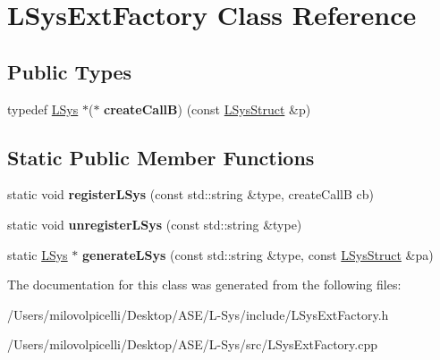 \hypertarget{class_l_sys_ext_factory}{}\section{L\+Sys\+Ext\+Factory Class Reference}
\label{class_l_sys_ext_factory}
\subsection*{Public Types}
\begin{DoxyCompactItemize}
\item 
\mbox{\label{class_l_sys_ext_factory_aea07e09c73a0012c0253ed86ade05183}} 
typedef \hyperlink{class_l_sys}{L\+Sys} $\ast$($\ast$ {\bfseries create\+CallB}) (const \hyperlink{struct_l_sys_struct}{L\+Sys\+Struct} \&p)
\end{DoxyCompactItemize}
\subsection*{Static Public Member Functions}
\begin{DoxyCompactItemize}
\item 
\mbox{\label{class_l_sys_ext_factory_a524bfed8598c8ffdaca2faf2157495f2}} 
static void {\bfseries register\+L\+Sys} (const std\+::string \&type, create\+CallB cb)
\item 
\mbox{\label{class_l_sys_ext_factory_ad35f53d013ae6d1103a27bd4f1e6d920}} 
static void {\bfseries unregister\+L\+Sys} (const std\+::string \&type)
\item 
\mbox{\label{class_l_sys_ext_factory_a6fff1491369857a2b5ba9ba0699a3d5c}} 
static \hyperlink{class_l_sys}{L\+Sys} $\ast$ {\bfseries generate\+L\+Sys} (const std\+::string \&type, const \hyperlink{struct_l_sys_struct}{L\+Sys\+Struct} \&pa)
\end{DoxyCompactItemize}


The documentation for this class was generated from the following files\+:\begin{DoxyCompactItemize}
\item 
/\+Users/milovolpicelli/\+Desktop/\+A\+S\+E/\+L-\/\+Sys/include/L\+Sys\+Ext\+Factory.\+h\item 
/\+Users/milovolpicelli/\+Desktop/\+A\+S\+E/\+L-\/\+Sys/src/L\+Sys\+Ext\+Factory.\+cpp\end{DoxyCompactItemize}
